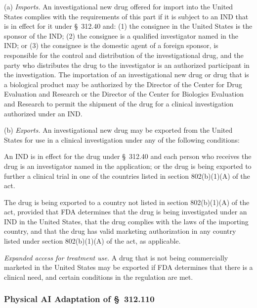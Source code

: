 \documentclass[11pt]{article}
\begin{document}
(a) \textit{Imports.} An investigational new drug offered for import into the United States complies with the requirements of this part if it is subject to an IND that is in effect for it under \S~312.40 and: (1) the consignee in the United States is the sponsor of the IND; (2) the consignee is a qualified investigator named in the IND; or (3) the consignee is the domestic agent of a foreign sponsor, is responsible for the control and distribution of the investigational drug, and the party who distributes the drug to the investigator is an authorized participant in the investigation. The importation of an investigational new drug or drug that is a biological product may be authorized by the Director of the Center for Drug Evaluation and Research or the Director of the Center for Biologics Evaluation and Research to permit the shipment of the drug for a clinical investigation authorized under an IND.

(b) \textit{Exports.} An investigational new drug may be exported from the United States for use in a clinical investigation under any of the following conditions:

\begin{description}[leftmargin=0.5cm,style=sameline]
\item[(1)] An IND is in effect for the drug under \S~312.40 and each person who receives the drug is an investigator named in the application; or the drug is being exported to further a clinical trial in one of the countries listed in section 802(b)(1)(A) of the act.
\item[(2)] The drug is being exported to a country not listed in section 802(b)(1)(A) of the act, provided that FDA determines that the drug is being investigated under an IND in the United States, that the drug complies with the laws of the importing country, and that the drug has valid marketing authorization in any country listed under section 802(b)(1)(A) of the act, as applicable.
\item[(3)] \textit{Expanded access for treatment use.} A drug that is not being commercially marketed in the United States may be exported if FDA determines that there is a clinical need, and certain conditions in the regulation are met.
\end{description}

\subsubsection{Physical AI Adaptation of \S~312.110}
\end{document}
